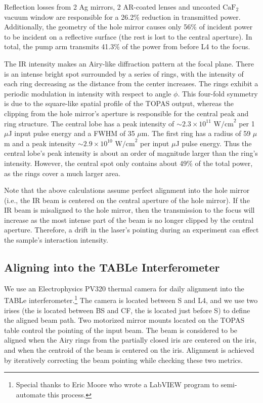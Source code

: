 Reflection losses from 2 Ag mirrors, 2 AR-coated lenses and uncoated $\text{CaF}_2$ vacuum window are responsible for a 26.2\% reduction in transmitted power. Additionally, the geometry of the hole mirror causes only 56\% of incident power to be incident on a reflective surface (the rest is lost to the central aperture). In total, the pump arm transmits 41.3\% of the power from before L4 to the focus.

The IR intensity makes an Airy-like diffraction pattern at the focal plane. There is an intense bright spot surrounded by a series of rings, with the intensity of each ring decreasing as the distance from the center increases. The rings exhibit a periodic modulation in intensity with respect to angle $\phi$. This four-fold symmetry is due to the square-like spatial profile of the TOPAS output, whereas the clipping from the hole mirror's aperture is responsible for the central peak and ring structure. The central lobe has a peak intensity of $\sim 2.3 \times 10^{11} \text{ W/cm}^2$ per 1 $\mu$J input pulse energy and a FWHM of 35 $\mu$m. The first ring has a radius of 59 $\mu$m and a peak intensity $\sim 2.9 \times 10^{10} \text{ W/cm}^2$ per input $\mu$J pulse energy. Thus the central lobe's peak intensity is about an order of magnitude larger than the ring's intensity. However, the central spot only contains about 49\% of the total power, as the rings cover a much larger area.

Note that the above calculations assume perfect alignment into the hole mirror (i.e., the IR beam is centered on the central aperture of the hole mirror). If the IR beam is misaligned to the hole mirror, then the transmission to the focus will increase as the most intense part of the beam is no longer clipped by the central aperture. Therefore, a drift in the laser's pointing during an experiment can effect the sample's interaction intensity.

\subsection{Aligning into the TABLe Interferometer}

We use an Electrophysics PV320 thermal camera for daily alignment into the TABLe interferometer.\footnote{Special thanks to Eric Moore who wrote a LabVIEW program to semi-automate this process.} The camera is located between S and L4, and we use two irises (the  is located between BS and CF, the  is located just before S) to define the aligned beam path. Two motorized mirror mounts located on the TOPAS table control the pointing of the input beam. The beam is considered to be aligned when the Airy rings from the partially closed  iris are centered on the  iris, and when the centroid of the beam is centered on the  iris. Alignment is achieved by iteratively correcting the beam pointing while checking these two metrics.

